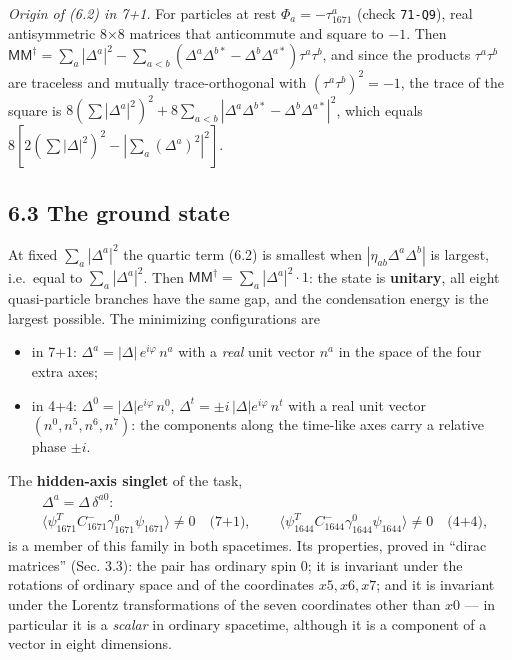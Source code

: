 \documentclass[
  10pt,
]{article}
\providecommand{\tightlist}{%
  \setlength{\itemsep}{0pt}\setlength{\parskip}{0pt}}
\begin{document}
\emph{Origin of (6.2) in 7+1.} For particles at rest
\(\Phi_a=-\tau_{1671}^a\) (check \texttt{71-Q9}), real antisymmetric 8×8
matrices that anticommute and square to \(-1\). Then
\(\mathsf M\mathsf M^\dagger=\sum_a|\Delta^a|^2-\sum_{a<b}(\Delta^a\Delta^{b*}-\Delta^b\Delta^{a*})\tau^a\tau^b\),
and since the products \(\tau^a\tau^b\) are traceless and mutually
trace-orthogonal with \((\tau^a\tau^b)^2=-1\), the trace of the square
is
\(8(\sum|\Delta^a|^2)^2+8\sum_{a<b}|\Delta^a\Delta^{b*}-\Delta^b\Delta^{a*}|^2\),
which equals \(8[2(\sum|\Delta|^2)^2-|\sum_a(\Delta^a)^2|^2]\).

\hypertarget{the-ground-state}{%
\subsection{6.3 The ground state}\label{the-ground-state}}

At fixed \(\sum_a|\Delta^a|^2\) the quartic term (6.2) is smallest when
\(|\eta_{ab}\Delta^a\Delta^b|\) is largest, i.e.~equal to
\(\sum_a|\Delta^a|^2\). Then
\(\mathsf M\mathsf M^\dagger=\sum_a|\Delta^a|^2\cdot1\): the state is
\textbf{unitary}, all eight quasi-particle branches have the same gap,
and the condensation energy is the largest possible. The minimizing
configurations are

\begin{itemize}
\tightlist
\item
  in 7+1: \(\Delta^a=|\Delta|\,e^{i\varphi}\,n^a\) with a \emph{real}
  unit vector \(n^a\) in the space of the four extra axes;
\item
  in 4+4: \(\Delta^0=|\Delta|e^{i\varphi}\,n^0\),
  \(\Delta^t=\pm i\,|\Delta|e^{i\varphi}\,n^t\) with a real unit vector
  \((n^0,n^5,n^6,n^7)\): the components along the time-like axes carry a
  relative phase \(\pm i\).
\end{itemize}

The \textbf{hidden-axis singlet} of the task,
\[\boxed{\;\begin{aligned}&\Delta^a=\Delta\,\delta^{a0}:\\
&\langle\psi_{1671}^TC_{1671}^{-}\gamma_{1671}^0\psi_{1671}\rangle\neq0\quad\text{(7+1)},\qquad\langle\psi_{1644}^TC_{1644}^{-}\gamma_{1644}^0\psi_{1644}\rangle\neq0\quad\text{(4+4)},\end{aligned}\;}\tag{6.3}\]
is a member of this family in both spacetimes. Its properties, proved in
``dirac matrices'' (Sec. 3.3): the pair has ordinary spin 0; it is
invariant under the rotations of ordinary space and of the coordinates
\(x5,x6,x7\); and it is invariant under the Lorentz transformations of
the seven coordinates other than \(x0\) --- in particular it is a
\emph{scalar} in ordinary spacetime, although it is a component of a
vector in eight dimensions.
\end{document}
